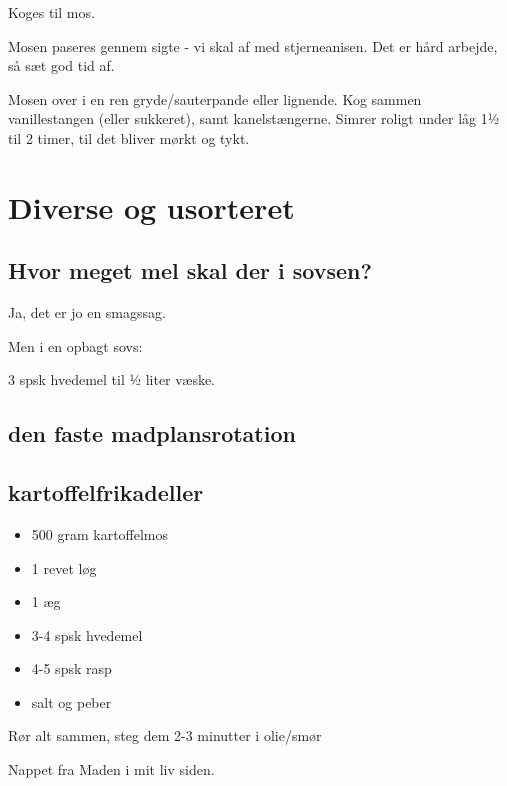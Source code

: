 \documentclass[
  letterpaper,
  DIV=11,
  numbers=noendperiod]{scrreprt}
\providecommand{\tightlist}{%
  \setlength{\itemsep}{0pt}\setlength{\parskip}{0pt}}\usepackage{longtable,booktabs,array}
\begin{document}
Koges til mos.

Mosen paseres gennem sigte - vi skal af med stjerneanisen. Det er hård
arbejde, så sæt god tid af.

Mosen over i en ren gryde/sauterpande eller lignende. Kog sammen
vanillestangen (eller sukkeret), samt kanelstængerne. Simrer roligt
under låg 1½ til 2 timer, til det bliver mørkt og tykt.


\hypertarget{diverse-og-usorteret}{%
\chapter{Diverse og usorteret}\label{diverse-og-usorteret}}

\hypertarget{hvor-meget-mel-skal-der-i-sovsen}{%
\section{Hvor meget mel skal der i
sovsen?}\label{hvor-meget-mel-skal-der-i-sovsen}}

Ja, det er jo en smagssag.

Men i en opbagt sovs:

3 spsk hvedemel til ½ liter væske.

\hypertarget{den-faste-madplansrotation}{%
\section{den faste madplansrotation}\label{den-faste-madplansrotation}}

\hypertarget{kartoffelfrikadeller}{%
\section{kartoffelfrikadeller}\label{kartoffelfrikadeller}}

\begin{itemize}
\tightlist
\item
  500 gram kartoffelmos
\item
  1 revet løg
\item
  1 æg
\item
  3-4 spsk hvedemel
\item
  4-5 spsk rasp
\item
  salt og peber
\end{itemize}

Rør alt sammen, steg dem 2-3 minutter i olie/smør

Nappet fra Maden i mit liv siden.
\end{document}

